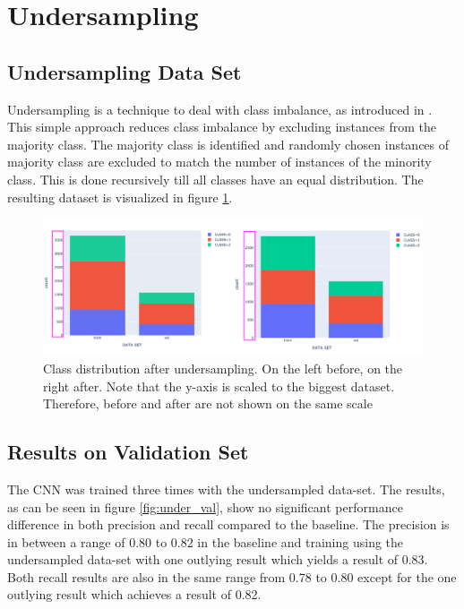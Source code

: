 \section{Undersampling}
\subsection{Undersampling Data Set}
Undersampling is a technique to deal with class imbalance, as introduced in \cite{bloem2020methology1}. This simple approach reduces class imbalance by excluding instances from the majority class. The majority class is identified and randomly chosen instances of majority class are excluded to match the number of instances of the minority class. This is done recursively till all classes have an equal distribution. The resulting dataset is visualized in figure \ref{fig:undersampling_class_distribution}.

\begin{figure}[h]
    \centering
    \includegraphics[width=\linewidth]{figures/undersampling/distribution_classes_before_after.png}
    \caption{Class distribution after undersampling. On the left before, on the right after. Note that the y-axis is scaled to the biggest dataset. Therefore, before and after are not shown on the same scale}
    \label{fig:undersampling_class_distribution}
\end{figure}

\subsection{Results on Validation Set} 
The CNN was trained three times with the undersampled data-set. The results, as can be seen in figure \ref{fig:under_val}, show no significant performance difference in both precision and recall compared to the baseline. The precision is in between a range of 0.80 to 0.82 in the baseline and training using the undersampled data-set with one outlying result which yields a result of 0.83. Both recall results are also in the same range from 0.78 to 0.80 except for the one outlying result which achieves a result of 0.82. 

